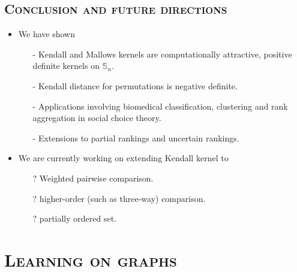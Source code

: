 \documentclass[xcolor=x11names,compress]{beamer}
\theoremstyle{plain}
\renewcommand{\(}{\begin{columns}}
\renewcommand{\)}{\end{columns}}
\newcommand{\<}[1]{\begin{column}{#1}}
\renewcommand{\>}{\end{column}}
\newcommand{\Sn}{\mathbb{S}_n}
\begin{document}
\subsection{\scshape Conclusion and future directions}
\begin{frame}{\insertsubsection}
	
	\begin{itemize}
		\item We have shown
		\begin{itemize}
		 \item[-] Kendall and Mallows kernels are computationally attractive, positive definite kernels on $\Sn$.
		 \item[-] Kendall distance for permutations is negative definite.
		 \item[-] Applications involving biomedical classification, clustering and rank aggregation in social choice theory.
		 \item[-] Extensions to partial rankings and uncertain rankings.
		\end{itemize}
		
		\pause
		
		\item We are currently working on extending Kendall kernel to
		\begin{itemize}
			\item[?] Weighted pairwise comparison.
			\item[?] higher-order (such as three-way) comparison.
			\item[?] partially ordered set.
		\end{itemize}
	\end{itemize}
	
\end{frame}

\section{\scshape Learning on graphs}
\end{document}
